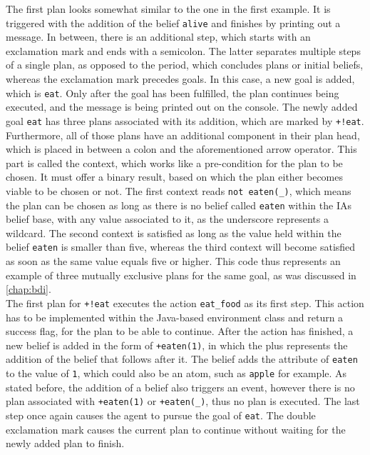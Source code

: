 \documentclass[draft,final]{vutinfth} %
\begin{document}
The first plan looks somewhat similar to the one in the first example. 
It is triggered with the addition of the belief \verb|alive| and finishes by printing out a message. 
In between, there is an additional step, which starts with an exclamation mark and ends with a semicolon.
The latter separates multiple steps of a single plan, as opposed to the period, which concludes plans or initial beliefs, whereas the exclamation mark precedes goals. 
In this case, a new goal is added, which is \verb|eat|. 
Only after the goal has been fulfilled, the plan continues being executed, and the message is being printed out on the console. 
The newly added goal \verb|eat| has three plans associated with its addition, which are marked by \verb|+!eat|. 
Furthermore, all of those plans have an additional component in their plan head, which is placed in between a colon and the aforementioned arrow operator. 
This part is called the context, which works like a pre-condition for the plan to be chosen. 
It must offer a binary result, based on which the plan either becomes viable to be chosen or not. 
The first context reads \verb|not eaten(_)|, which means the plan can be chosen as long as there is no belief called \verb|eaten| within the IAs belief base, with any value associated to it, as the underscore represents a wildcard. 
The second context is satisfied as long as the value held within the belief \verb|eaten| is smaller than five, whereas the third context will become satisfied as soon as the same value equals five or higher. 
This code thus represents an example of three mutually exclusive plans for the same goal, as was discussed in \autoref{chap:bdi}.\\
The first plan for \verb|+!eat| executes the action \verb|eat_food| as its first step. 
This action has to be implemented within the Java-based environment class and return a success flag, for the plan to be able to continue. 
After the action has finished, a new belief is added in the form of \verb|+eaten(1)|, in which the plus represents the addition of the belief that follows after it. 
The belief adds the attribute of \verb|eaten| to the value of \verb|1|, which could also be an atom, such as \verb|apple| for example. 
As stated before, the addition of a belief also triggers an event, however there is no plan associated with \verb|+eaten(1)| or \verb|+eaten(_)|, thus no plan is executed. 
The last step once again causes the agent to pursue the goal of \verb|eat|. 
The double exclamation mark causes the current plan to continue without waiting for the newly added plan to finish. 
\end{document}
